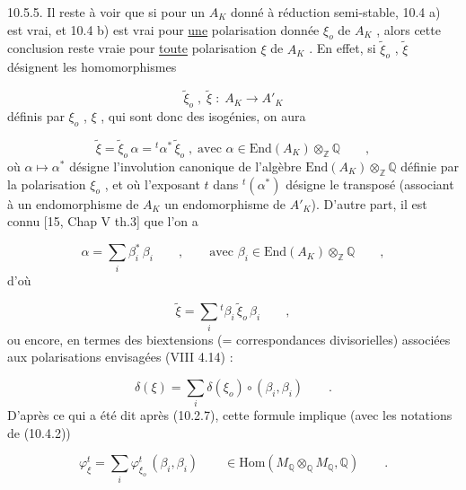 
10.5.5.  Il reste à voir que si pour un $A_K$ donné à réduction semi-stable, 10.4 a) est vrai, et 10.4 b) est vrai pour \underline{une} polarisation donnée $\xi_o$ de $A_K$ , alors cette conclusion reste vraie pour \underline{toute} polarisation $\xi$ de $A_K$ . En effet, si $\widetilde{\xi}_o$ , $\widetilde{\xi}$ désignent les homomorphismes

\begin{equation*}
\widetilde{\xi}_o \;,\; \widetilde{\xi} \;:\; A_K \longrightarrow A'_K
\end{equation*}
définis par $\xi_o$ , $\xi$ , qui sont donc des isogénies, on aura

\begin{equation*}
\widetilde{\xi} = \widetilde{\xi}_o \, \alpha = {}^t\alpha^* \, \widetilde{\xi}_o \;,\; \text{avec } \alpha \in \mathrm{End}(A_K) \otimes_{\mathbb{Z}} \mathbb{Q} \qquad ,
\end{equation*}
où $\alpha \longmapsto \alpha^*$ désigne l'involution canonique de l'algèbre $\mathrm{End}(A_K) \otimes_{\mathbb{Z}} \mathbb{Q}$ définie par la polarisation $\xi_o$ , et où l'exposant $t$ dans ${}^t(\alpha^*)$ désigne le transposé (associant à un endomorphisme de $A_K$ un endomorphisme de $A'_K$). D'autre part, il est connu [15, Chap V th.3] que l'on a

\begin{equation*}
\alpha = \sum_i \beta_i^* \, \beta_i \qquad , \qquad \text{avec } \beta_i \in \mathrm{End}(A_K) \otimes_{\mathbb{Z}} \mathbb{Q} \qquad ,
\end{equation*}
d'où

\begin{equation*}
\widetilde{\xi} = \sum_i {}^t\beta_i \, \widetilde{\xi}_o \, \beta_i \qquad ,
\end{equation*}
ou encore, en termes des biextensions (= correspondances divisorielles) associées aux polarisations envisagées (VIII 4.14) :

\begin{equation}\tag{10.5.5.1}
\delta(\xi) = \sum_i \delta(\xi_o) \circ (\beta_i , \beta_i) \qquad .
\end{equation}
D'après ce qui a été dit après (10.2.7), cette formule implique (avec les notations de (10.4.2))

\begin{equation}\tag{10.5.5.2}
\varphi^t_{\xi} = \sum_i \varphi^t_{\xi_o} \, (\beta_i , \beta_i) \qquad \in \mathrm{Hom}(M_{\mathbb{Q}} \otimes_{\mathbb{Q}} M_{\mathbb{Q}} , \mathbb{Q}) \qquad .
\end{equation}

